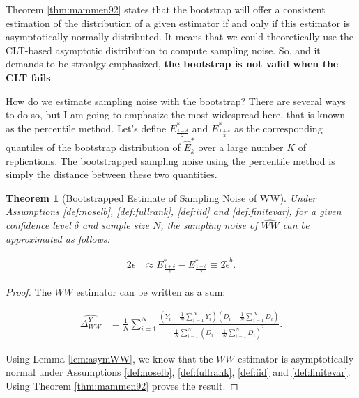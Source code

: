 \documentclass[
]{book}
\newtheorem{theorem}{Theorem}[chapter]
\theoremstyle{definition}
\theoremstyle{definition}
\theoremstyle{definition}
\theoremstyle{definition}
\theoremstyle{remark}
\begin{document}
Theorem \ref{thm:mammen92} states that the bootstrap will offer a consistent estimation of the distribution of a given estimator if and only if this estimator is asymptotically normally distributed.
It means that we could theoretically use the CLT-based asymptotic distribution to compute sampling noise.
So, and it demands to be stronlgy emphasized, \textbf{the bootstrap is not valid when the CLT fails}.

How do we estimate sampling noise with the bootstrap?
There are several ways to do so, but I am going to emphasize the most widespread here, that is known as the percentile method.
Let's define \(E^*_{\frac{1-\delta}{2}}\) and \(E^*_{\frac{1+\delta}{2}}\) as the corresponding quantiles of the bootstrap distribution of \(\hat{E}^*_k\) over a large number \(K\) of replications.
The bootstrapped sampling noise using the percentile method is simply the distance between these two quantities.

\begin{theorem}[Bootstrapped Estimate of Sampling Noise of WW]
\protect\hypertarget{thm:bootnoiseWW}{}{\label{thm:bootnoiseWW} \iffalse (Bootstrapped Estimate of Sampling Noise of WW) \fi{} }Under Assumptions \ref{def:noselb}, \ref{def:fullrank}, \ref{def:iid} and \ref{def:finitevar}, for a given confidence level \(\delta\) and sample size \(N\), the sampling noise of \(\hat{WW}\) can be approximated as follows:

\begin{align*}
2\epsilon & \approx E^*_{\frac{1+\delta}{2}}-E^*_{\frac{1-\delta}{2}} \equiv 2\tilde{\epsilon}^b.
\end{align*}
\end{theorem}

\begin{proof}
\iffalse{} {Proof. } \fi{}The \(WW\) estimator can be written as a sum:

\begin{align*}
\hat{\Delta^Y_{WW}} & = \frac{1}{N}\sum_{i=1}^N\frac{\left(Y_i-\frac{1}{N}\sum_{i=1}^NY_i\right)\left(D_i-\frac{1}{N}\sum_{i=1}^ND_i\right)}{\frac{1}{N}\sum_{i=1}^N\left(D_i-\frac{1}{N}\sum_{i=1}^ND_i\right)^2}.
\end{align*}

Using Lemma \ref{lem:asymWW}, we know that the \(WW\) estimator is asymptotically normal under Assumptions \ref{def:noselb}, \ref{def:fullrank}, \ref{def:iid} and \ref{def:finitevar}.
Using Theorem \ref{thm:mammen92} proves the result.
\end{proof}
\end{document}
